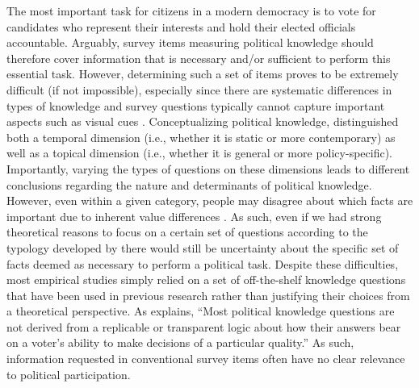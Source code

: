 \documentclass[12pt]{article}
\begin{document}
The most important task for citizens in a modern democracy is to vote for candidates who represent their interests and hold their elected officials accountable. Arguably, survey items measuring political knowledge should therefore cover information that is necessary and/or sufficient to perform this essential task. However, determining such a set of items proves to be extremely difficult (if not impossible), especially since there are systematic differences in types of knowledge \citep{barabas2014question} and survey questions typically cannot capture important aspects such as visual cues \citep{prior2014visual}. Conceptualizing political knowledge, \citet{barabas2014question} distinguished both a temporal dimension (i.e., whether it is static or more contemporary) as well as a topical dimension (i.e., whether it is general or more policy-specific). Importantly, varying the types of questions on these dimensions leads to different conclusions regarding the nature and determinants of political knowledge. However, even within a given category, people may disagree about which facts are important due to inherent value differences \citep[c.f.,][]{lupia2015uninformed}. As such, even if we had strong theoretical reasons to focus on a certain set of questions according to the typology developed by \citet{barabas2014question} there would still be uncertainty about the specific set of facts deemed as necessary to perform a political task. Despite these difficulties, most empirical studies simply relied on a set of off-the-shelf knowledge questions that have been used in previous research rather than justifying their choices from a theoretical perspective. As \citet[219]{lupia2006elitism} explains, ``Most political knowledge questions are not derived from a replicable or transparent logic about how their answers bear on a voter's ability to make decisions of a particular quality.'' As such, information requested in conventional survey items often have no clear relevance to political participation. 
\end{document}
